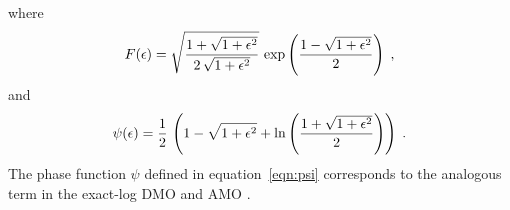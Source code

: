 where
\begin{equation}
F(\epsilon)=\sqrt{{1+\sqrt{1+\epsilon^2}} \over
{2\,\sqrt{1+\epsilon^2}}}\,
\exp\left({1-\sqrt{1+\epsilon^2}} \over 2\right)\;,
\label{eqn:F}
\end{equation}
and
\begin{equation}
\psi(\epsilon)={1 \over 2}\,\left(1 - \sqrt{1+\epsilon^2} +
\ln\left({1 + \sqrt{1+\epsilon^2}} \over 2\right)\right)\;.
\label{eqn:psi}
\end{equation}
The phase function $\psi$ defined in equation~\ref{eqn:psi}
corresponds to the analogous term in the exact-log DMO and AMO
\cite[]{GEO55-05-05950607,GEO61-03-08150820,Biondi02}.




